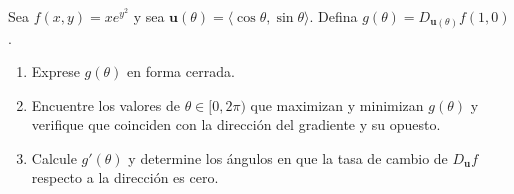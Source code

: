 Sea $f(x, y) = xe^{y^2}$ y sea $\mathbf{u}(\theta) = \langle \cos\theta, \sin\theta \rangle$. Defina $g(\theta) = D_{\mathbf{u}(\theta)} f(1, 0)$.
\begin{enumerate}
    \item Exprese $g(\theta)$ en forma cerrada.
    \item Encuentre los valores de $\theta \in [0, 2\pi)$ que maximizan y minimizan $g(\theta)$ y verifique que coinciden con la dirección del gradiente y su opuesto.
    \item Calcule $g'(\theta)$ y determine los ángulos en que la tasa de cambio de $D_{\mathbf{u}} f$ respecto a la dirección es cero.
\end{enumerate}
